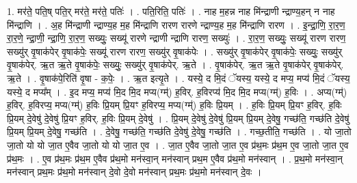 \documentclass[17pt]{extarticle}
\begin{document}
1. मर॑ते॒ पति॒ष् पति॒र् मर॑ते॒ मर॑ते॒ पतिः॑ । . पति॒रिति॒ पतिः॑ । . नाह म॒हन्न नाह मि॑न्द्राणी न्द्राण्य॒हन् न नाह मि॑न्द्राणि । . अ॒ह मि॑न्द्राणी न्द्राण्य॒ह म॒ह मि॑न्द्राणि रारण रारणे न्द्राण्य॒ह म॒ह मि॑न्द्राणि रारण । . इ॒न्द्रा॒णि॒ रा॒र॒ण॒ रा॒र॒णे॒ न्द्रा॒णी॒ न्द्रा॒णि॒ रा॒र॒ण॒ सख्युः॒ सख्यू॑ रारणे न्द्राणी न्द्राणि रारण॒ सख्युः॑ । . रा॒र॒ण॒ सख्युः॒ सख्यू॑ रारण रारण॒ सख्यु॑र् वृ॒षाक॑पेर् वृ॒षाक॑पेः॒ सख्यू॑ रारण रारण॒ सख्यु॑र् वृ॒षाक॑पेः । . सख्यु॑र् वृ॒षाक॑पेर् वृ॒षाक॑पेः॒ सख्युः॒ सख्यु॑र् वृ॒षाक॑पेर्. ऋ॒त ऋ॒ते वृ॒षाक॑पेः॒ सख्युः॒ सख्यु॑र् वृ॒षाक॑पेर्. ऋ॒ते । . वृ॒षाक॑पेर्. ऋ॒त ऋ॒ते वृ॒षाक॑पेर् वृ॒षाक॑पेर्. ऋ॒ते । . वृ॒षाक॑पे॒रिति॑ वृ॒षा - क॒पेः॒ । . ऋ॒त इत्यृ॒ते । . यस्ये॒ द मि॒दं ॅयस्य॒ यस्ये॒ द मप्य॒ मप्य॑ मि॒दं ॅयस्य॒ यस्ये॒ द मप्य᳚म् । . इ॒द मप्य॒ मप्य॑ मि॒द मि॒द मप्य(ग्म्॑) ह॒विर्. ह॒विरप्य॑ मि॒द मि॒द मप्य(ग्म्॑) ह॒विः । . अप्य(ग्म्॑) ह॒विर्. ह॒विरप्य॒ मप्य(ग्म्॑) ह॒विः प्रि॒यम् प्रि॒यꣳ ह॒विरप्य॒ मप्य(ग्म्॑) ह॒विः प्रि॒यम् । . ह॒विः प्रि॒यम् प्रि॒यꣳ ह॒विर्. ह॒विः प्रि॒यम् दे॒वेषु॑ दे॒वेषु॑ प्रि॒यꣳ ह॒विर्. ह॒विः प्रि॒यम् दे॒वेषु॑ । . प्रि॒यम् दे॒वेषु॑ दे॒वेषु॑ प्रि॒यम् प्रि॒यम् दे॒वेषु॒ गच्छ॑ति॒ गच्छ॑ति दे॒वेषु॑ प्रि॒यम् प्रि॒यम् दे॒वेषु॒ गच्छ॑ति । . दे॒वेषु॒ गच्छ॑ति॒ गच्छ॑ति दे॒वेषु॑ दे॒वेषु॒ गच्छ॑ति । . गच्छ॒तीति॒ गच्छ॑ति । . यो जा॒तो जा॒तो यो यो जा॒त ए॒वैव जा॒तो यो यो जा॒त ए॒व । . जा॒त ए॒वैव जा॒तो जा॒त ए॒व प्र॑थ॒मः प्र॑थ॒म ए॒व जा॒तो जा॒त ए॒व प्र॑थ॒मः । . ए॒व प्र॑थ॒मः प्र॑थ॒म ए॒वैव प्र॑थ॒मो मन॑स्वा॒न् मन॑स्वान् प्रथ॒म ए॒वैव प्र॑थ॒मो मन॑स्वान् । . प्र॒थ॒मो मन॑स्वा॒न् मन॑स्वान् प्रथ॒मः प्र॑थ॒मो मन॑स्वान् दे॒वो दे॒वो मन॑स्वान् प्रथ॒मः प्र॑थ॒मो मन॑स्वान् दे॒वः । \newline
\end{document}
